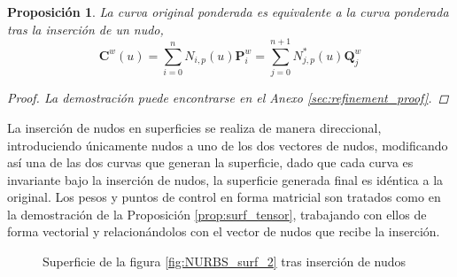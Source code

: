 \documentclass[11pt]{book}
\theoremstyle{plain} %
\newtheorem{proposicion}[teorema]{Proposición}
\theoremstyle{definition} %
\theoremstyle{definition} %
\begin{document}
\begin{proposicion}
    La curva original ponderada es equivalente a la curva ponderada tras la inserción de un nudo,
    \begin{equation*}
        \mathbf{C}^{w}(u) = \sum_{i=0}^{n} N_{i,p}(u) \mathbf{P}_{i}^{w}=  \sum_{j=0}^{n+1} N_{j,p}^*(u) \mathbf{Q}_{j}^{w} 
    \end{equation*}
    \begin{proof}
        La demostración puede encontrarse en el Anexo \ref{sec:refinement_proof}.
    \end{proof}
\end{proposicion}

La inserción de nudos en superficies se realiza de manera direccional, introduciendo únicamente nudos a uno de los dos vectores de nudos,
modificando así una de las dos curvas que generan la superficie, dado que cada curva es invariante bajo la inserción de nudos, la superficie generada final es idéntica a la original.
Los pesos y puntos de control en forma matricial son tratados como en la demostración de la Proposición \ref{prop:surf_tensor}, trabajando con ellos de forma vectorial y
relacionándolos con el vector de nudos que recibe la inserción.

\begin{figure}[H]
    \centering
    \scriptsize
    
    
    \caption{Superficie de la figura \ref{fig:NURBS_surf_2} tras inserción de nudos}\label{fig:NURBS_surf_3}
    \vspace{-0.2cm} 
\end{figure}
\end{document}
